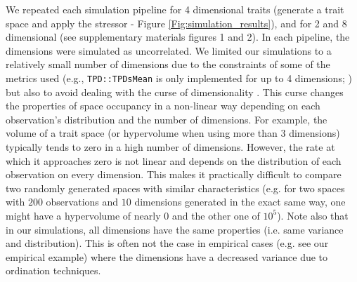 \documentclass[12pt,letterpaper]{article}
\begin{document}
We repeated each simulation pipeline for 4 dimensional traits (generate a trait space and apply the stressor - Figure \ref{Fig:simulation_results}), and for 2 and 8 dimensional (see supplementary materials figures 1 and 2).
In each pipeline, the dimensions were simulated as uncorrelated.
We limited our simulations to a relatively small number of dimensions due to the constraints of some of the metrics used (e.g., \texttt{TPD::TPDsMean} is only implemented for up to 4 dimensions; \citealt{carmona2019trait}) but also to avoid dealing with the curse of dimensionality \citep{bellman1957dynamic}.
This curse changes the properties of space occupancy in a non-linear way depending on each observation's distribution and the number of dimensions.
For example, the volume of a trait space (or hypervolume when using more than 3 dimensions) typically tends to zero in a high number of dimensions.
However, the rate at which it approaches zero is not linear and depends on the distribution of each observation on every dimension.
This makes it practically difficult to compare two randomly generated spaces with similar characteristics (e.g. for two spaces with $200$ observations and $10$ dimensions generated in the exact same way, one might have a hypervolume of nearly $0$ and the other one of $10^5$).
Note also that in our simulations, all dimensions have the same properties (i.e. same variance and distribution).
This is often not the case in empirical cases (e.g. see our empirical example) where the dimensions have a decreased variance due to ordination techniques.
 
\end{document}
